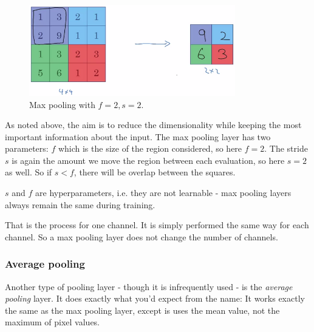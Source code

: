 \documentclass[12pt, a4paper]{article}
\numberwithin{equation}{section}
\begin{document}
\begin{figure}
\centering
\includegraphics[width=0.8\textwidth]{max_pooling}
\caption{Max pooling with $f=2, s=2$.}
\label{fig:max_pooling}
\end{figure}

As noted above, the aim is to reduce the dimensionality while keeping the most important information about the input. The max pooling layer has two parameters: $f$ which is the size of the region considered, so here $f=2$. The stride $s$ is again the amount we move the region between each evaluation, so here $s=2$ as well. So if $s<f$, there will be overlap between the squares.

$s$ and $f$ are hyperparameters, i.e. they are not learnable - max pooling layers always remain the same during training.

That is the process for one channel. It is simply performed the same way for each channel. So a max pooling layer does not change the number of channels.

\subsubsection{Average pooling}
Another type of pooling layer - though it is infrequently used - is the \textit{average pooling} layer. It does exactly what you'd expect from the name: It works exactly the same as the max pooling layer, except is uses the mean value, not the maximum of pixel values.
\end{document}
